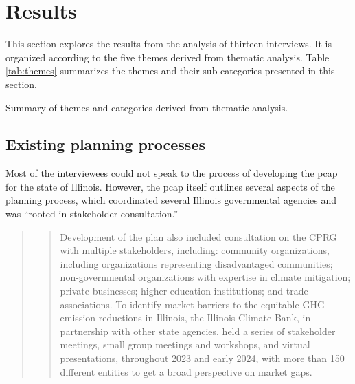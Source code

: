 \section{Results}
This section explores the results from the analysis of thirteen interviews. It
is organized according to the five themes derived from thematic analysis. Table
\ref{tab:themes} summarizes the themes and their sub-categories presented in
this section.

\begin{table}[ht!]
    \centering
    \caption{Summary of themes and categories derived from thematic analysis.}
    \label{tab:themes}
    
\end{table}
\FloatBarrier

\subsection{Existing planning processes}
\label{section:planning-processes}
Most of the interviewees could not speak to the process of developing the
\acf{pcap} for the state of Illinois. However, the \ac{pcap} itself outlines
several aspects of the planning process, which coordinated several Illinois
governmental agencies and was ``rooted in stakeholder consultation.''

\begin{quote}
    \blockcquote[10]{kibbey_state_2024}{Development of the plan also included
    consultation on the CPRG with multiple stakeholders, including: community
    organizations, including organizations representing disadvantaged
    communities; non-governmental organizations with expertise in climate
    mitigation; private businesses; higher education institutions; and trade
    associations. To identify market barriers to the equitable GHG emission
    reductions in Illinois, the Illinois Climate Bank, in partnership with other
    state agencies, held a series of stakeholder meetings, small group meetings
    and workshops, and virtual presentations, throughout 2023 and early 2024,
    with more than 150 different entities to get a broad perspective on market
    gaps.}
\end{quote}

